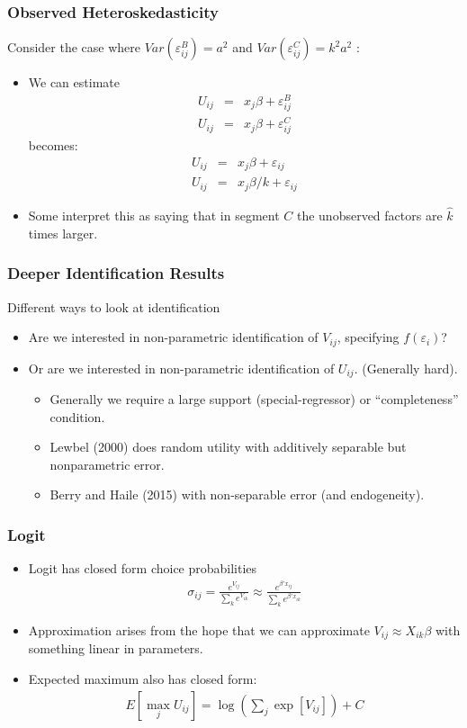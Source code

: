 \documentclass[aspectratio=169,11pt]{beamer}
\begin{document}
\begin{frame}
\frametitle{Observed Heteroskedasticity}
Consider the case where $Var(\varepsilon_{ij}^B) = a^2$ and   $Var(\varepsilon_{ij}^C) =  k^2 a^2$ :
\begin{itemize}
\item We can estimate
\begin{eqnarray*}
U_{ij} &=& x_j \beta + \varepsilon_{ij}^B\\
U_{ij} &=& x_j \beta + \varepsilon_{ij}^C
\end{eqnarray*}
becomes:
\begin{eqnarray*}
U_{ij} &=& x_j \beta + \varepsilon_{ij}\\
U_{ij} &=& x_j \beta/k+ \varepsilon_{ij}
\end{eqnarray*}
\item Some interpret this as saying that in segment $C$ the unobserved factors are $\hat{k}$ times larger.
\end{itemize}
\end{frame}

\begin{frame}
\frametitle{Deeper Identification Results}
Different ways to look at identification
\begin{itemize}
\item Are we interested in non-parametric identification of $V_{ij}$, specifying $f(\varepsilon_i)$?
\item Or are we interested in non-parametric identification of $U_{ij}$. (Generally hard).
\begin{itemize}
\item Generally we require a large support (special-regressor) or ``completeness'' condition.
\item Lewbel (2000) does random utility with additively separable but nonparametric error.\item Berry and Haile (2015) with non-separable error (and endogeneity).
\end{itemize}
\end{itemize}
\end{frame}


\begin{frame}
\frametitle{Logit}
\begin{itemize}
\item Logit has closed form choice probabilities
\begin{eqnarray*}
\sigma_{ij} = \frac{e^{V_{ij}}}{\sum_k e^{V_{ik}}} \approx \frac{e^{\beta' x_{ij}}}{\sum_k e^{\beta' x_{ik}}}
\end{eqnarray*}
\item Approximation arises from the hope that we can approximate $V_{ij} \approx  X_{ik} \beta$ with something linear in parameters.
\item Expected maximum also has closed form:
\begin{eqnarray*}
E[\max_j U_{ij}] = \log \left(\sum_j \exp[V_{ij}] \right) + C
\end{eqnarray*}
\end{itemize}
\end{frame}
\end{document}

